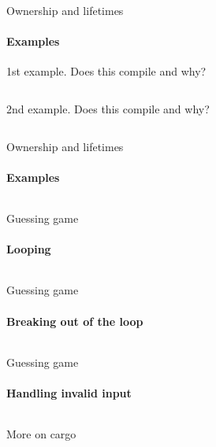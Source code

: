 \documentclass[usenames,dvipsnames,10pt,aspectratio=169]{beamer}
\begin{document}
\begin{frame}{Ownership and lifetimes}
	\framesubtitle{Examples}
	1st example. Does this compile and why?
	\inputminted[fontsize=\normalsize]{c}{code/own1.rs}
	\vspace{0.6cm}
	2nd example. Does this compile and why?
	\inputminted[fontsize=\normalsize]{c}{code/own2.rs}
\end{frame}

\begin{frame}{Ownership and lifetimes}
	\framesubtitle{Examples}
	\inputminted[fontsize=\large]{c}{code/own3.rs}
\end{frame}

\begin{frame}{Guessing game}
	\framesubtitle{Looping}
	\inputminted[fontsize=\normalsize]{c}{code/guess5.rs}
\end{frame}

\begin{frame}{Guessing game}
	\framesubtitle{Breaking out of the loop}
	\inputminted[fontsize=\large]{c}{code/guess6.rs}
\end{frame}

\begin{frame}{Guessing game}
	\framesubtitle{Handling invalid input}
	\inputminted[fontsize=\normalsize]{c}{code/guess7.rs}
\end{frame}

\begin{frame}{More on cargo}
	\inputminted[fontsize=\large]{shell}{code/cargo.sh}
	\vspace{0.5cm}
\end{frame}

\end{document}
